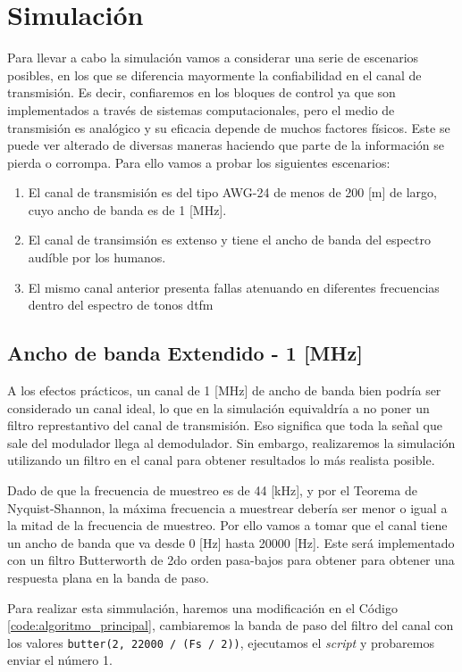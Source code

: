 \section{Simulación}
Para llevar a cabo la simulación vamos a considerar una serie de escenarios posibles, en los que se diferencia mayormente la confiabilidad en el canal de transmisión. Es decir, confiaremos en los bloques de control ya que son implementados a través de sistemas computacionales, pero el medio de transmisión es analógico y su eficacia depende de muchos factores físicos. Este se puede ver alterado de diversas maneras haciendo que parte de la información se pierda o corrompa. Para ello vamos a probar los siguientes escenarios:

\begin{enumerate}
  \item El canal de transmisión es del tipo AWG-24 de menos de 200 [m] de largo, cuyo ancho de banda es de 1 [MHz].
  \item El canal de transimsión es extenso y tiene el ancho de banda del espectro audíble por los humanos.
  \item El mismo canal anterior presenta fallas atenuando en diferentes frecuencias dentro del espectro de tonos \gls{dtfm}
\end{enumerate}

\subsection{Ancho de banda Extendido - 1 [MHz]}
A los efectos prácticos, un canal de 1 [MHz] de ancho de banda bien podría ser considerado un canal ideal, lo que en la simulación equivaldría a no poner un filtro represtantivo del canal de transmisión. Eso significa que toda la señal que sale del modulador llega al demodulador. Sin embargo, realizaremos la simulación utilizando un filtro en el canal para obtener resultados lo más realista posible.

Dado de que la frecuencia de muestreo es de 44 [kHz], y por el Teorema de Nyquist-Shannon, la máxima frecuencia a muestrear debería ser menor o igual a la mitad de la frecuencia de muestreo. Por ello vamos a tomar que el canal tiene un ancho de banda que va desde 0 [Hz] hasta 20000 [Hz]. Este será implementado con un filtro Butterworth de 2do orden pasa-bajos para obtener para obtener una respuesta plana en la banda de paso.

Para realizar esta simmulación, haremos una modificación en el Código \ref{code:algoritmo_principal}, cambiaremos la banda de paso del filtro del canal con los valores \lstinline{butter(2, 22000 / (Fs / 2))}, ejecutamos el \textit{script} y probaremos enviar el número 1.

